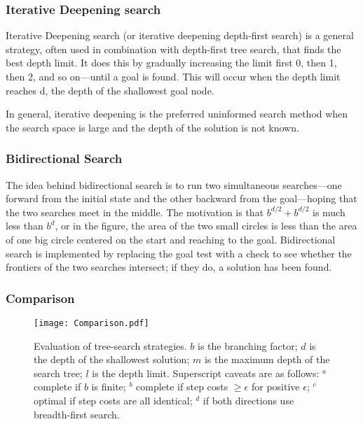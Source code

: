 \subsubsection{Iterative Deepening search}
 Iterative Deepening search (or iterative deepening depth-first search) is a general strategy, often used in combination with depth-first tree search, that finds the best depth limit. It does this by gradually increasing the limit first 0, then 1, then 2, and so on—until a goal is found. This will occur when the depth limit reaches d, the depth of the shallowest goal node.

 In general, iterative deepening is the preferred uninformed search method when the search space is large and the depth of the solution is not known.

 \subsubsection{Bidirectional Search}
 The idea behind bidirectional search is to run two simultaneous searches—one forward from the initial state and the other backward from the goal—hoping that the two searches meet in the middle. The motivation is that $b^{d/2} + b^{d/2}$ is much less than $b^d$, or in the figure, the area of the two small circles is less than the area of one big circle centered on the start and reaching to the goal.
Bidirectional search is implemented by replacing the goal test with a check to see whether the frontiers of the two searches intersect; if they do, a solution has been found.
\subsubsection{Comparison}
\begin{figure}[h!t]
\centering
\texttt{[image: Comparison.pdf]}
\caption{ Evaluation of tree-search strategies. $b$ is the branching factor; $d$ is the depth of the shallowest solution; $m$ is the maximum depth of the search tree; $l$ is the depth limit.
Superscript caveats are as follows: $^{a}$ complete if $b$ is finite; $^{b}$ complete if step costs $\geq \epsilon$ for positive $\epsilon$; $^{c}$ optimal if step costs are all identical; $^{d}$ if both directions use breadth-first search.}
\label{fig:Strategies comparison}
\end{figure}

